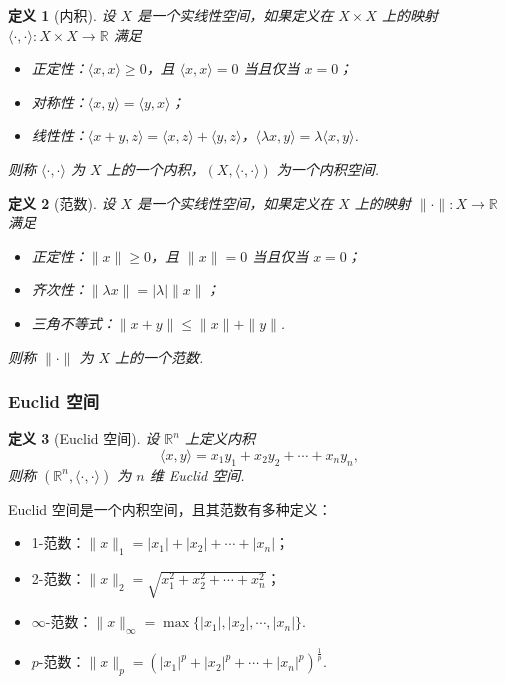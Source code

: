 \documentclass{ctexart}
\newcommand{\。}{．} %
\newenvironment{lvse}{
    \begin{tcolorbox}[enhanced, breakable, colback=qlv, boxrule=0pt, frame hidden,
        borderline west={0.7mm}{0.1mm}{slv}]
    }
    {\end{tcolorbox}}
\theoremstyle{t} %
\newtheorem{dyhj}{\color{slv} 定义}[subsection] %
\newenvironment{dy}{\begin{lvse}\begin{dyhj}}{\end{dyhj}\end{lvse}}
\begin{document}
\begin{dy}[内积]
    设 $X$ 是一个实线性空间，如果定义在 $X \times X$ 上的映射 $\langle \cdot, \cdot \rangle: X \times X \to \mathbb{R}$ 满足
    \begin{itemize}
        \item 正定性：$\langle x, x \rangle \geq 0$，且 $\langle x, x \rangle = 0$ 当且仅当 $x = 0$；
        \item 对称性：$\langle x, y \rangle = \langle y, x \rangle$；
        \item 线性性：$\langle x + y, z \rangle = \langle x, z \rangle + \langle y, z \rangle$，$\langle \lambda x, y \rangle = \lambda \langle x, y \rangle$.
    \end{itemize}
    则称 $\langle \cdot, \cdot \rangle$ 为 $X$ 上的一个内积，$(X, \langle \cdot, \cdot \rangle)$ 为一个内积空间.
\end{dy}

\begin{dy}[范数]
    设 $X$ 是一个实线性空间，如果定义在 $X$ 上的映射 $\| \cdot \|: X \to \mathbb{R}$ 满足
    \begin{itemize}
        \item 正定性：$\| x \| \geq 0$，且 $\| x \| = 0$ 当且仅当 $x = 0$；
        \item 齐次性：$\| \lambda x \| = |\lambda| \| x \|$；
        \item 三角不等式：$\| x + y \| \leq \| x \| + \| y \|$.
    \end{itemize}
    则称 $\| \cdot \|$ 为 $X$ 上的一个范数.
\end{dy}

\subsubsection{Euclid 空间}

\begin{dy}[Euclid 空间]
    设 $\mathbb{R}^n$ 上定义内积
    $$
        \langle x, y \rangle = x_1 y_1 + x_2 y_2 + \cdots + x_n y_n,
    $$ 
    则称 $(\mathbb{R}^n, \langle \cdot, \cdot \rangle)$ 为 $n$ 维 Euclid 空间.
\end{dy}

Euclid 空间是一个内积空间，且其范数有多种定义：
\begin{itemize}
    \item 1-范数：$\| x \|_1 = |x_1| + |x_2| + \cdots + |x_n|$；
    \item 2-范数：$\| x \|_2 = \sqrt{x_1^2 + x_2^2 + \cdots + x_n^2}$；
    \item $\infty$-范数：$\| x \|_\infty = \max \{ |x_1|, |x_2|, \cdots, |x_n| \}$.
    \item $p$-范数：$\| x \|_p = \left( |x_1|^p + |x_2|^p + \cdots + |x_n|^p \right)^{\frac{1}{p}}$.
\end{itemize}
\end{document}
